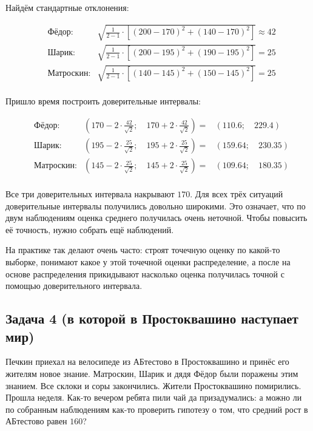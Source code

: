 \documentclass[12pt, a4paper, oneside]{article}
\begin{document}
Найдём стандартные отклонения:

\begin{equation*} 
\begin{aligned} 
& \text{Фёдор:}  & \sqrt{ \frac{1}{2-1} \cdot \left[ (200 - 170)^2 + (140 - 170)^2 \right] } \approx 42 \\
& \text{Шарик:}  & \sqrt{ \frac{1}{2-1} \cdot \left[ (200 - 195)^2 + (190 - 195)^2 \right] }= 25 \\
& \text{Матроскин:} & \sqrt{ \frac{1}{2-1} \cdot \left[ (140 - 145)^2 + (150 - 145)^2 \right] }= 25 \\
\end{aligned}
\end{equation*}

Пришло время построить доверительные интервалы: 

\begin{equation*} 
\begin{aligned} 
& \text{Фёдор:}  & \left( 170 -  2 \cdot \frac{42}{\sqrt{2}}; \quad 170 + 2 \cdot \frac{42}{\sqrt{2}} \right) = &  (110.6; \quad 229.4) \\
& \text{Шарик:}  &  \left( 195 -  2 \cdot \frac{25}{\sqrt{2}}; \quad 195 + 2 \cdot \frac{25}{\sqrt{2}} \right) = &  (159.64; \quad  230.35) \\
& \text{Матроскин:} &  \left( 145 -  2 \cdot \frac{25}{\sqrt{2}}; \quad 145 + 2 \cdot \frac{25}{\sqrt{2}} \right) = &  (109.64; \quad  180.35) \\
\end{aligned}
\end{equation*}

Все три доверительных интервала накрывают $170$.  Для всех трёх ситуаций доверительные интервалы получились довольно широкими. Это означает, что по двум наблюдениям оценка среднего получилась очень неточной. Чтобы повысить её точность, нужно собрать ещё наблюдений. 

На практике так делают очень часто: строят точечную оценку по какой-то выборке, понимают какое у этой точечной оценки распределение, а после на основе распределения прикидывают насколько оценка получилась точной с помощью доверительного интервала. 

\subsection*{Задача 4 (в которой в Простоквашино наступает мир)}

Печкин приехал на велосипеде из АБтестово в Простоквашино и принёс его жителям новое знание. Матроскин, Шарик и дядя Фёдор были поражены этим знанием. Все склоки и соры закончились. Жители Простоквашино помирились. Прошла неделя. Как-то вечером ребята пили чай да призадумались: а можно ли по собранным наблюдениям как-то проверить гипотезу о том, что средний рост в АБтестово равен $160$? 
\end{document}
